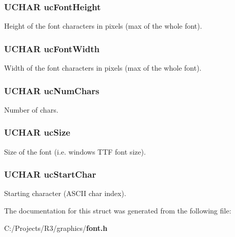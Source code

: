\subsubsection[{ucFontHeight}]{\setlength{\rightskip}{0pt plus 5cm}UCHAR {\bf ucFontHeight}}\label{struct_f_o_n_t___s_t_r_u_c_t_ab3175289052b4768c364d9fb34e3d325}


Height of the font characters in pixels (max of the whole font). 
\subsubsection[{ucFontWidth}]{\setlength{\rightskip}{0pt plus 5cm}UCHAR {\bf ucFontWidth}}\label{struct_f_o_n_t___s_t_r_u_c_t_ace39af379708aaef6c59b3cfe52aea19}


Width of the font characters in pixels (max of the whole font). 
\subsubsection[{ucNumChars}]{\setlength{\rightskip}{0pt plus 5cm}UCHAR {\bf ucNumChars}}\label{struct_f_o_n_t___s_t_r_u_c_t_ac3983ceb3f841824870c7491b83618b4}


Number of chars. 
\subsubsection[{ucSize}]{\setlength{\rightskip}{0pt plus 5cm}UCHAR {\bf ucSize}}\label{struct_f_o_n_t___s_t_r_u_c_t_a337c0e603ae3d59d95c77626cabab943}


Size of the font (i.e. windows TTF font size). 
\subsubsection[{ucStartChar}]{\setlength{\rightskip}{0pt plus 5cm}UCHAR {\bf ucStartChar}}\label{struct_f_o_n_t___s_t_r_u_c_t_a98cb8dbe6d13e63a61b600b71618d001}


Starting character (ASCII char index). 

The documentation for this struct was generated from the following file:\begin{DoxyCompactItemize}
\item 
C:/Projects/R3/graphics/{\bf font.h}\end{DoxyCompactItemize}
